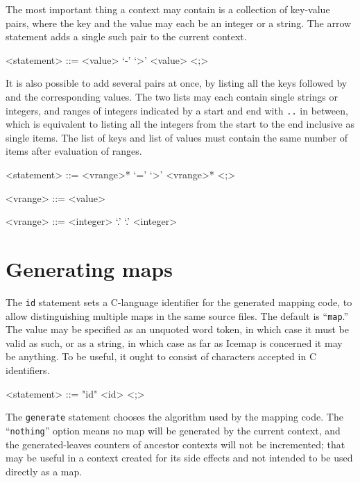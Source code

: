 \documentclass{mitsuba}
\begin{document}
The most important thing a context may contain is a collection of key-value
pairs, where the key and the value may each be an integer or a string.  The
arrow statement
adds a single such pair to the current context.

\begin{grammar}
<statement> ::= <value> `-' `>' <value> <;>
\end{grammar}

It is also possible to add several pairs at once, by listing all the keys
followed by  and
the corresponding values.  The two lists may
each contain single strings or integers, and ranges of integers indicated by
a start and end with \texttt{..} in between, which is equivalent to listing
all the integers from the start to the end inclusive as single items.  The
list of keys and list of values must contain the same number of items after
evaluation of ranges.

\begin{grammar}
<statement> ::= <vrange>* `=' `>' <vrange>* <;>

<vrange> ::= <value>

<vrange> ::= <integer> `.' `.' <integer>
\end{grammar}

\section{Generating maps}

The \texttt{id} statement sets a C-language identifier for the generated
mapping code, to allow distinguishing multiple maps in the same source
files.  The default is ``\texttt{map}.''  The value may be specified as
an unquoted word token, in which case it must be valid as such, or as a
string, in which case as far as Icemap is concerned it may be anything. 
To be useful, it ought to consist of characters accepted in C identifiers.

\begin{grammar}
<statement> ::= "id" <id> <;>
\end{grammar}

The \texttt{generate} statement chooses
the algorithm used by the mapping code. 
The
``\texttt{nothing}'' option means no map will be generated by the current
context, and the generated-leaves counters of ancestor contexts will not be
incremented; that may be useful in a context created for its side effects
and not intended to be used directly as a map.
\end{document}
